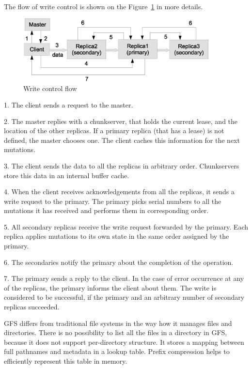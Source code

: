 The flow of write control is shown on the Figure~\ref{fig:write_control_flow} in
more details.

\begin{figure}
  \centering
  \includegraphics [width=0.9\textwidth]{images/write_control_flow}
  \caption{Write control flow}
  \label{fig:write_control_flow}
\end{figure}

1. The client sends a request to the master.

2. The master replies with a chunkserver, that holds the current lease, and the location of the other replicas.
If a primary replica (that has a lease) is not defined, the master chooses one. 
The client caches this information for the next mutations.

3. The client sends the data to all the replicas in arbitrary order.
Chunkservers store this data in an internal buffer cache. 

4. When the client receives acknowledgements from all the replicas, it sends a write request to the primary.
The primary picks serial numbers to all the mutations it has received and performs them in corresponding order.

5. All secondary replicas receive the write request forwarded by the primary.
Each replica applies mutations to its own state in the same order assigned by the primary.

6. The secondaries notify the primary about the completion of the operation.

7. The primary sends a reply to the client.
In the case of error occurrence at any of the replicas, the primary informs the client about them.
The write is considered to be successful, if the primary and an arbitrary number of secondary replicas succeeded.

GFS differs from traditional file systems in the way how it manages files and directories.
There is no possibility to list all the files in a directory in GFS, because it does not support per-directory structure.
It stores a mapping between full pathnames and metadata in a lookup table.
Prefix compression helps to efficiently represent this table in memory. 

